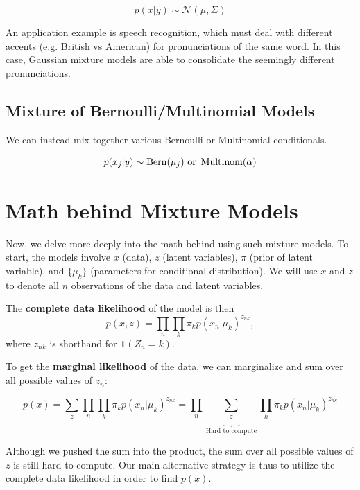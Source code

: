 \documentclass{article}
\begin{document}
	\[p(x | y) \sim \mathcal{N}(\mu, \Sigma)  \]

	An application example is speech recognition, which must deal with different accents (e.g. British vs American) for pronunciations of the same word.  In this case, Gaussian mixture models are able to consolidate the seemingly different pronunciations.


\subsection{Mixture of Bernoulli/Multinomial Models}

	We can instead mix together various Bernoulli or Multinomial conditionals. 

	\[ p(x_j | y) \sim \operatorname{Bern}(\mu_j) \text{ or } \operatorname{Multinom}(\alpha) \]



\section{Math behind Mixture Models}

Now, we delve more deeply into the math behind using such mixture models.  To start, the models involve $x$ (data), $z$ (latent variables), $\pi$ (prior of latent variable), and $\{\mu_k\}$ (parameters for conditional distribution).  We will use $x$ and $z$ to denote all $n$ observations of the data and latent variables.

\smallskip

The {\bf complete data likelihood} of the model is then 
\[ p(x, z) = \prod_{n} \prod_{k} \pi_k p(x_n | \mu_k)^{z_{nk}},  \]
where $z_{nk}$ is shorthand for $\mathbf{1}(Z_n = k)$.

To get the {\bf marginal likelihood} of the data, we can marginalize and sum over all possible values of $z_n$:	

\[p(x) = \sum_{z} \prod_n \prod_k \pi_k p(x_n | \mu_k)^{{z_{nk}}} = \prod_n \underbrace{\sum_{z}}_{\text{Hard to compute}} \prod_k \pi_k p(x_n | \mu_k)^{z_{nk}}  \]

Although we pushed the sum into the product, the sum over all possible values of $z$ is still hard to compute.  Our main alternative strategy is thus to utilize the complete data likelihood in order to find $p(x)$.  
\end{document}

